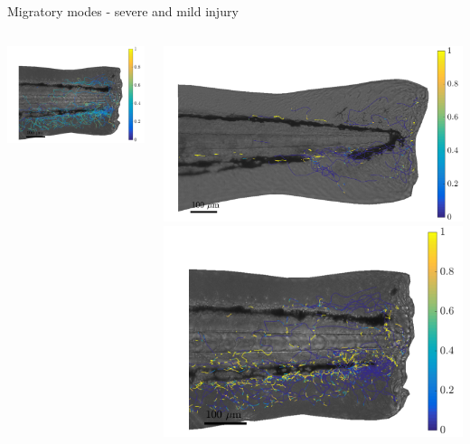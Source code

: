 \documentclass[mathserif,11pt]{beamer}
\begin{document}
\begin{frame}{Migratory modes - severe and mild injury}
\begin{columns}
\begin{column}{0.31\textwidth}
		\vspace{0.2cm}
		\includegraphics[scale=0.17]{Figures/severe1_mode2.png}
	\end{column}
	\begin{column}{0.31\textwidth}
		\vspace{-0.2cm}
		\includegraphics[scale=0.137]{Figures/mild1_mode3.png}\vfil
		\vspace{0.2cm}
		\includegraphics[scale=0.17]{Figures/severe1_mode3.png}

\end{column}
\end{columns}
\end{frame}
\end{document}
